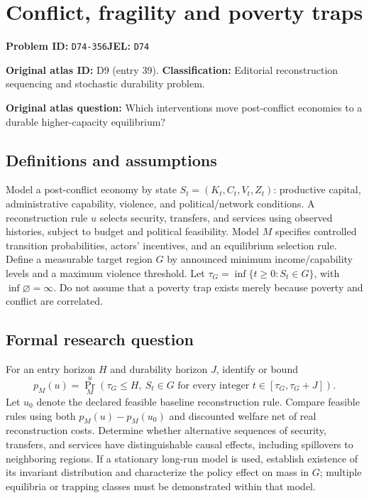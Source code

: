 \documentclass[11pt,a4paper]{article}
\begin{document}
\section*{Conflict, fragility and poverty traps}
\textbf{Problem ID:} \texttt{D74-356}\quad \textbf{JEL:} \texttt{D74}\par
\label{problem:OP-0039}
\label{atlas:prob:D9}
\noindent\textbf{Original atlas ID:} D9 (entry 39). \textbf{Classification:} Editorial reconstruction sequencing and stochastic durability problem.

\noindent\textbf{Original atlas question:} Which interventions move post-conflict economies to a durable higher-capacity equilibrium?

\subsection*{Definitions and assumptions}
Model a post-conflict economy by state $S_t=(K_t,C_t,V_t,Z_t)$: productive capital, administrative capability, violence, and political/network conditions. A reconstruction rule $u$ selects security, transfers, and services using observed histories, subject to budget and political feasibility. Model $M$ specifies controlled transition probabilities, actors' incentives, and an equilibrium selection rule. Define a measurable target region $G$ by announced minimum income/capability levels and a maximum violence threshold. Let $\tau_G=\inf\{t\geq0:S_t\in G\}$, with $\inf\varnothing=\infty$. Do not assume that a poverty trap exists merely because poverty and conflict are correlated.
\subsection*{Formal research question}
For an entry horizon $H$ and durability horizon $J$, identify or bound
\[
 p_M(u)=\Pr_M^u\!\left(\tau_G\leq H,
          \ S_t\in G\text{ for every integer }t\in[\tau_G,\tau_G+J]\right).
\]
Let $u_0$ denote the declared feasible baseline reconstruction rule. Compare feasible rules using both $p_M(u)-p_M(u_0)$ and discounted welfare net of real reconstruction costs. Determine whether alternative sequences of security, transfers, and services have distinguishable causal effects, including spillovers to neighboring regions. If a stationary long-run model is used, establish existence of its invariant distribution and characterize the policy effect on mass in $G$; multiple equilibria or trapping classes must be demonstrated within that model.
\end{document}
